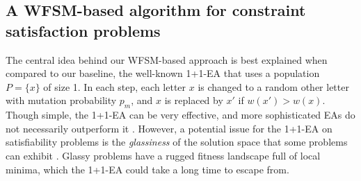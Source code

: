 \documentclass{llncs}
\newcommand{\text}[1]{\textrm{#1}}
\begin{document}




\subsection{A WFSM-based algorithm for constraint satisfaction problems}





The central idea behind our WFSM-based approach is best explained when
compared to our baseline, the well-known 1+1-EA that uses a population $P=\{x\}$ of size 1. 
In each step, each letter $x$ is changed to a random other letter with
mutation probability $p_m$, and $x$ is replaced by $x'$ if $w(x') > w(x)$. Though simple, the 1+1-EA
can be very effective, and more sophisticated EAs do not necessarily outperform it 
\cite{Borisovsky_2008}. 
However, a potential issue for the 1+1-EA on satisfiability problems is 
the \emph{glassiness} of the solution space that some problems can exhibit \cite{Martin_2001}.
Glassy problems have a rugged fitness landscape full of local minima, which the 
1+1-EA could take a long time to escape from.
\end{document}
